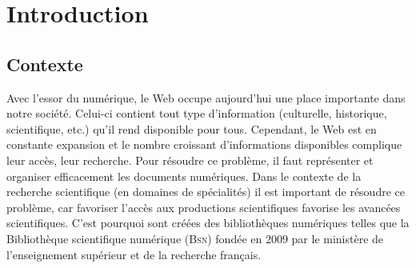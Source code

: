 \chapter{Introduction}
\label{chap:main-introduction}


  \section{Contexte}
  \label{sec:main-introduction-context}
    Avec l'essor du numérique, le Web occupe aujourd'hui une place importante
    dans notre société. Celui-ci contient tout type d'information (culturelle,
    historique, scientifique, etc.) qu'il rend disponible pour tous. Cependant,
    le Web est en constante expansion et le nombre croissant d'informations
    disponibles complique leur accès, leur recherche. Pour résoudre ce problème,
    il faut représenter et organiser efficacement les documents numériques. Dans
    le contexte de la recherche scientifique (en domaines de spécialités) il est
    important de résoudre ce problème, car favoriser l'accès aux productions
    scientifiques favorise les avancées scientifiques. C'est pourquoi sont
    créées des bibliothèques numériques telles que la Bibliothèque scientifique
    numérique (\textsc{Bsn}) fondée en 2009 par le ministère de l'enseignement
    supérieur et de la recherche français.

